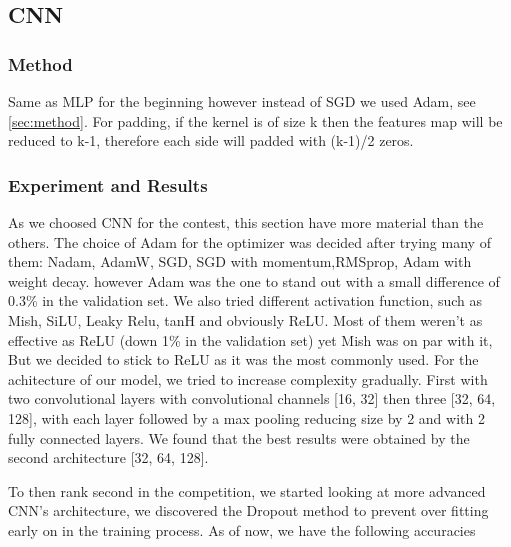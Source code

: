 \subsection{CNN}
\subsubsection{Method}
Same as MLP for the beginning however instead of SGD we used Adam, see \ref{sec:method}. For padding, if the kernel is of size k then the features map will be reduced to k-1, therefore each side will padded with (k-1)/2 zeros. 

\subsubsection{Experiment and Results}
As we choosed CNN for the contest, this section have more material than the others. 
The choice of Adam for the optimizer was decided after trying many of them: Nadam, AdamW, SGD, SGD with momentum,RMSprop, Adam with weight decay. however Adam was the one to stand out with a small difference of 0.3\% in the validation set. We also tried different activation function, such as Mish, SiLU, Leaky Relu, tanH and obviously ReLU. Most of them weren't as effective as ReLU (down 1\% in the validation set) yet Mish was on par with it, But we decided to stick to ReLU as it was the most commonly used.
For the achitecture of our model, we tried to increase complexity gradually. First with two convolutional layers with convolutional channels [16, 32] then three [32, 64, 128], with each layer followed by a max pooling reducing size by 2 and with 2 fully connected layers. 
We found that the best results were obtained by the second architecture [32, 64, 128]. 
\begin{center}
    \label{tab:macro_f1_accuracy}
\end{center}

To then rank second in the competition, we started looking at more advanced CNN's architecture, we discovered the Dropout method to prevent over fitting early on in the training process. As of now, we have the following accuracies


